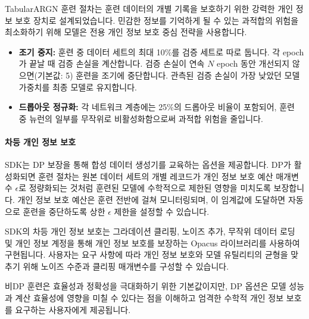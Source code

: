 TabularARGN 훈련 절차는 훈련 데이터의 개별 기록을 보호하기 위한 강력한 개인 정보 보호 장치로 설계되었습니다. 민감한 정보를 기억하게 될 수 있는 과적합의 위험을 최소화하기 위해 모델은 전용 개인 정보 보호 중심 전략을 사용합니다.
\begin{itemize}
\item \textbf{조기 중지:} 훈련 중 데이터 세트의 최대 10\%를 검증 세트로 따로 둡니다. 각 epoch가 끝날 때 검증 손실을 계산합니다. 검증 손실이 연속 $N$ epoch 동안 개선되지 않으면(기본값: 5) 훈련을 조기에 중단합니다. 관측된 검증 손실이 가장 낮았던 모델 가중치를 최종 모델로 유지합니다.
\item \textbf{드롭아웃 정규화:} 각 네트워크 계층에는 25\%의 드롭아웃 비율이 포함되어, 훈련 중 뉴런의 일부를 무작위로 비활성화함으로써 과적합 위험을 줄입니다.
\end{itemize}

\paragraph{차등 개인 정보 보호}
SDK는 DP 보장을 통해 합성 데이터 생성기를 교육하는 옵션을 제공합니다. DP가 활성화되면 훈련 절차는 원본 데이터 세트의 개별 레코드가 개인 정보 보호 예산 매개변수 $\epsilon$로 정량화되는 것처럼 훈련된 모델에 수학적으로 제한된 영향을 미치도록 보장합니다. 개인 정보 보호 예산은 훈련 전반에 걸쳐 모니터링되며, 이 임계값에 도달하면 자동으로 훈련을 중단하도록 상한 $\epsilon$ 제한을 설정할 수 있습니다.

SDK의 차등 개인 정보 보호는 그라데이션 클리핑, 노이즈 추가, 무작위 데이터 로딩 및 개인 정보 계정을 통해 개인 정보 보호를 보장하는 Opacus 라이브러리를 사용하여 구현됩니다. 사용자는 요구 사항에 따라 개인 정보 보호와 모델 유틸리티의 균형을 맞추기 위해 노이즈 수준과 클리핑 매개변수를 구성할 수 있습니다.

비DP 훈련은 효율성과 정확성을 극대화하기 위한 기본값이지만, DP 옵션은 모델 성능과 계산 효율성에 영향을 미칠 수 있다는 점을 이해하고 엄격한 수학적 개인 정보 보호를 요구하는 사용자에게 제공됩니다.
